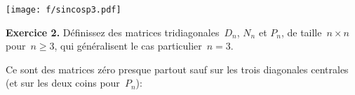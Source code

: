 \begin{center}
\texttt{[image: f/sincosp3.pdf]}
\end{center}


\clearpage

{\color{blue}
{\bf Exercice 2.}
Définissez des matrices tridiagonales~$D_n$, $N_n$ et $P_n$, de taille~$n\times
n$ pour~$n\ge 3$, qui généralisent le cas particulier~$n=3$.
}

Ce sont des matrices zéro presque partout sauf sur les trois diagonales
centrales (et sur les deux coins pour~$P_n$):


